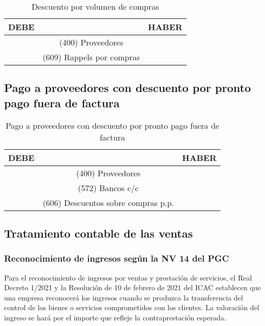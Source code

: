 \documentclass{article}
\begin{document}
\begin{table}[H]
\centering
\begin{tabular}{|c|c|c|}
\hline
\textbf{DEBE} & \textbf{} & \textbf{HABER} \\
\hline
\textbf{} & (400) Proveedores & \textbf{} \\
\hline
\textbf{} & (609) Rappels por compras & \textbf{} \\
\hline
\end{tabular}
\caption{Descuento por volumen de compras}
\end{table}

\subsection*{Pago a proveedores con descuento por pronto pago fuera de factura}


\begin{table}[H]
\centering
\begin{tabular}{|c|c|c|}
\hline
\textbf{DEBE} & \textbf{} & \textbf{HABER} \\
\hline
\textbf{} & (400) Proveedores & \textbf{} \\
\hline
\textbf{} & (572) Bancos c/c & \textbf{} \\
\hline
\textbf{} & (606) Descuentos sobre compras p.p. & \textbf{} \\
\hline
\end{tabular}
\caption{Pago a proveedores con descuento por pronto pago fuera de factura}
\end{table}

\subsection{Tratamiento contable de las ventas}

\subsubsection*{Reconocimiento de ingresos según la NV 14 del PGC}

Para el reconocimiento de ingresos por ventas y prestación de servicios, el Real Decreto 1/2021 y la Resolución de 10 de febrero de 2021 del ICAC establecen que una empresa reconocerá los ingresos cuando se produzca la transferencia del control de los bienes o servicios comprometidos con los clientes. La valoración del ingreso se hará por el importe que refleje la contraprestación esperada.\\
\end{document}
